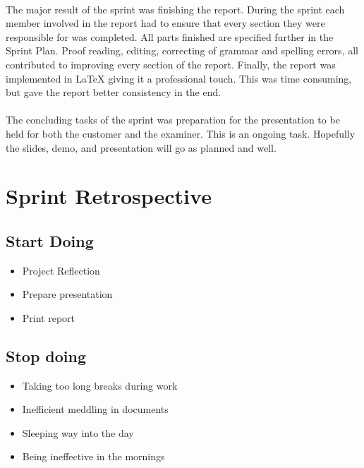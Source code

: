 \paragraph{} The major result of the sprint was finishing the report. During the sprint each member involved in the report had to ensure that every section they were responsible for was completed. All parts finished are specified further in the Sprint Plan. Proof reading, editing, correcting of grammar and spelling errors, all contributed to improving every section of the report. Finally, the report was implemented in LaTeX giving it a professional touch. This was time consuming, but gave the report better consistency in the end.

\paragraph{} The concluding tasks of the sprint was preparation for the presentation to be held for both the customer and the examiner. This is an ongoing task. Hopefully the slides, demo, and presentation will go as planned and well.


\section{Sprint Retrospective}
\label{sec:FinalRetrospective}

\subsection{Start Doing}
\begin{itemize}
\item Project Reflection
\item Prepare presentation
\item Print report
\end{itemize}

\subsection{Stop doing}
\begin{itemize}
\item Taking too long breaks during work
\item Inefficient meddling in documents
\item Sleeping way into the day
\item Being ineffective in the mornings
\end{itemize}

